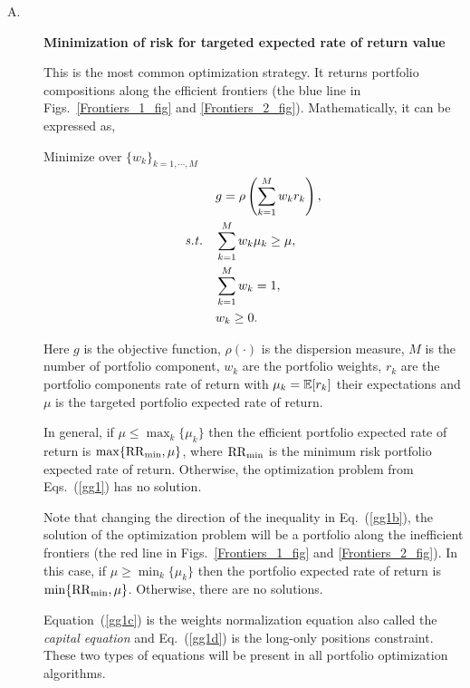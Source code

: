 \begin{description}
  \item[A.\label{OptRisk}]{\bf Minimization of risk for targeted expected rate of return value}

    This is the most common optimization strategy. It returns portfolio compositions along the efficient frontiers (the blue line in Figs.~\ref{Frontiers_1_fig} and
    \ref{Frontiers_2_fig}).
    Mathematically, it can be expressed as,

    \bigskip
    \noindent Minimize over $\{w_k\}_{k=1,\cdots,M}$
    \begin{subequations}\label{gg1}
    \begin{align}
        & g =  \rho\left(\sum_{k=1}^M w_k r_k \right), \label{gg1a} \\
        \st & \sum_{k=1}^M w_k \mu_k \ge \mu, \label{gg1b} \\
            & \sum_{k=1}^M w_k = 1, \label{gg1c} \\
            & w_k \ge 0. \label{gg1d}
    \end{align}
    \end{subequations}

    \noindent Here $g$ is the objective function, $\rho(\cdot)$ is the dispersion measure, $M$ is the number of portfolio component, $w_k$ are the portfolio
    weights, $r_k$ are the portfolio components rate of return
    with $\mu_k={\mathbb E}[r_k]$ their expectations and $\mu$ is the targeted portfolio expected rate of return.

    In general, if $\mu \leq \max_k\{\mu_k\}$ then the efficient portfolio expected rate of return is $\max\{{\rm RR}_{\min}, \mu \}$,
    where ${\rm RR}_{\min}$ is the minimum risk portfolio expected rate of return.
    Otherwise, the optimization problem from Eqs.~(\ref{gg1}) has no solution.

    Note that changing the direction of the inequality in Eq.~(\ref{gg1b}), the solution of the optimization problem
    will be a portfolio along the inefficient frontiers (the red line in Figs.~\ref{Frontiers_1_fig} and \ref{Frontiers_2_fig}). In this case,
    if $\mu \geq \min_k\{\mu_k\}$ then the portfolio expected rate of return is $\min\{{\rm RR}_{\min}, \mu \}$. Otherwise,
    there are no solutions.

    Equation~(\ref{gg1c}) is the weights normalization equation also called the {\it capital equation} and Eq.~(\ref{gg1d}) is the long-only positions constraint.
    These two types of equations will be present in all portfolio optimization algorithms.


\end{description}
